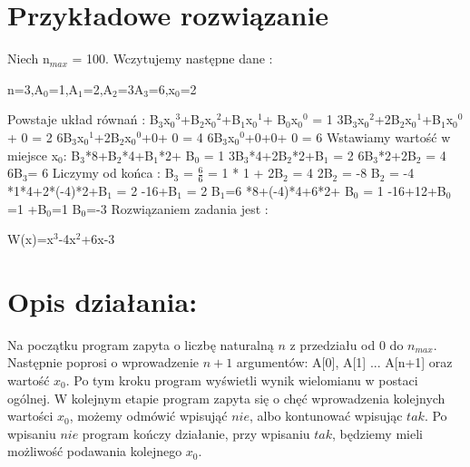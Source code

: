 \documentclass[11pt]{article}
\begin{document}
\section{Przykładowe rozwiązanie}
Niech n$_{max}$ = 100. Wczytujemy następne dane : \newline
\centerline{n=3,A$_{0}$=1,A$_{1}$=2,A$_{2}$=3A$_{3}$=6,x$_{0}$=2}
\newline \newline Powstaje układ równań : \newline 
B$_{3}$x$_{0}$$^{3}$+B$_{2}$x$_{0}$$^{2}$+B$_{1}$x$_{0}$$^{1}$+ B$_{0}$x$_{0}$$^{0}$ = 1 \newline
3B$_{3}$x$_{0}$$^{2}$+2B$_{2}$x$_{0}$$^{1}$+B$_{1}$x$_{0}$$^{0}$+ 0 = 2 \newline 
6B$_{3}$x$_{0}$$^{1}$+2B$_{2}$x$_{0}$$^{0}$+0+ 0 = 4 \newline
6B$_{3}$x$_{0}$$^{0}$+0+0+ 0 = 6 \newline \newline 
Wstawiamy wartość w miejsce x$_{0}$: \newline
B$_{3}$*8+B$_{2}$*4+B$_{1}$*2+ B$_{0}$ = 1 \newline
3B$_{3}$*4+2B$_{2}$*2+B$_{1}$ = 2 \newline 
6B$_{3}$*2+2B$_{2}$ = 4 \newline
6B$_{3}$= 6 \newline \newline 
Liczymy od końca : \newline
B$_{3}$ = $\frac {6}{6}$ = 1  * 1 + 2B$_{2}$ = 4 \newline
2B$_{2}$ = -8 \newline
B$_{2}$ = -4 *1*4+2*(-4)*2+B$_{1}$ = 2 -16+B$_{1}$ = 2 \newline
B$_{1}$=6 *8+(-4)*4+6*2+ B$_{0}$ = 1 -16+12+B$_{0}$=1 +B$_{0}$=1 \newline
B$_{0}$=-3 \newline
\newline
Rozwiązaniem zadania jest : \newline
\centerline {W(x)=x$^{3}$-4x$^{2}$+6x-3}

\clearpage

\section{Opis działania:}
Na początku program zapyta o liczbę naturalną $n$ z przedziału od 0 do $n_{max}$. Następnie poprosi o wprowadzenie $n + 1$ argumentów: A[0], A[1] ... A[n+1] oraz wartość $x_0$. Po tym kroku program wyświetli wynik wielomianu w postaci ogólnej. W kolejnym etapie program zapyta się o chęć wprowadzenia kolejnych wartości $x_0$, możemy odmówić wpisująć $nie$, albo kontunować wpisując $tak$. Po wpisaniu $nie$ program kończy działanie, przy wpisaniu $tak$, będziemy mieli możliwość podawania kolejnego $x_0$. 
\end{document}
